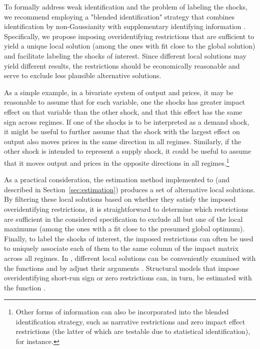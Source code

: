 \documentclass[nojss]{jss}
\begin{document}
To formally address weak identification and the problem of labeling the shocks, we recommend employing a "blended identification" strategy that combines identification by non-Gaussianity with supplementary identifying information \citep[cf.][]{Carriero+Marcellino+Tornese:2024}. Specifically, we propose imposing overidentifying restrictions that are sufficient to yield a unique local solution (among the ones with fit close to the global solution) and facilitate labeling the shocks of interest. Since different local solutions may yield different results, the restrictions should be economically reasonable and serve to exclude less plausible alternative solutions.

As a simple example, in a bivariate system of output and prices, it may be reasonable to assume that for each variable, one the shocks has greater impact effect on that variable than the other shock, and that this effect has the same sign across regimes. If one of the shocks is to be interpreted as a demand shock, it might be useful to further assume that the shock with the largest effect on output also moves prices in the same direction in all regimes. Similarly, if the other shock is intended to represent a supply shock, it could be useful to assume that it moves output and prices in the opposite directions in all regimes.\footnote{
Other forms of information can also be incorporated into the blended identification strategy, such as narrative restrictions and zero impact effect restrictions (the latter of which are testable due to statistical identification), for instance.
}

As a practical consideration, the estimation method implemented to  (and described in Section~\ref{sec:estimation}) produces a set of alternative local solutions. By filtering these local solutions based on whether they satisfy the imposed overidentifying restrictions, it is straightforward to determine which restrictions are sufficient in the considered specification to exclude all but one of the local maximums (among the ones with a fit close to the presumed global optimum). Finally, to label the shocks of interest, the imposed restrictions can often be used to uniquely associate each of them to the same column of the impact matrix across all regimes. In , different local solutions can be conveniently examined with the functions  and  by adjust their arguments . Structural models that impose overidentifying short-run sign or zero restrictions can, in turn, be estimated with the function .
\end{document}
